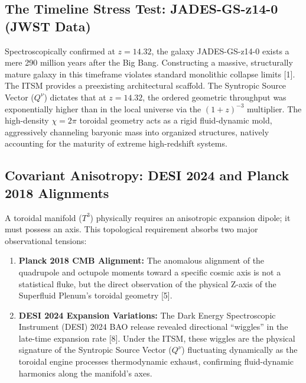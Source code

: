 \documentclass[aps,prd,onecolumn,linenumbers,superscriptaddress,nofootinbib]{revtex4-2}
\begin{document}
\subsection{The Timeline Stress Test: JADES-GS-z14-0 (JWST Data)}
Spectroscopically confirmed at $z = 14.32$, the galaxy JADES-GS-z14-0 exists a mere 290 million years after the Big Bang. Constructing a massive, structurally mature galaxy in this timeframe violates standard monolithic collapse limits [1]. The ITSM provides a preexisting architectural scaffold. The Syntropic Source Vector ($Q^\nu$) dictates that at $z = 14.32$, the ordered geometric throughput was exponentially higher than in the local universe via the $(1+z)^{-3}$ multiplier. The high-density $\chi = 2\pi$ toroidal geometry acts as a rigid fluid-dynamic mold, aggressively channeling baryonic mass into organized structures, natively accounting for the maturity of extreme high-redshift systems.

\subsection{Covariant Anisotropy: DESI 2024 and Planck 2018 Alignments}
A toroidal manifold ($T^3$) physically requires an anisotropic expansion dipole; it must possess an axis. This topological requirement absorbs two major observational tensions:
\begin{enumerate}
    \item \textbf{Planck 2018 CMB Alignment:} The anomalous alignment of the quadrupole and octupole moments toward a specific cosmic axis is not a statistical fluke, but the direct observation of the physical Z-axis of the Superfluid Plenum's toroidal geometry [5].
    \item \textbf{DESI 2024 Expansion Variations:} The Dark Energy Spectroscopic Instrument (DESI) 2024 BAO release revealed directional ``wiggles'' in the late-time expansion rate [8]. Under the ITSM, these wiggles are the physical signature of the Syntropic Source Vector ($Q^\nu$) fluctuating dynamically as the toroidal engine processes thermodynamic exhaust, confirming fluid-dynamic harmonics along the manifold's axes.
\end{enumerate}
\end{document}
